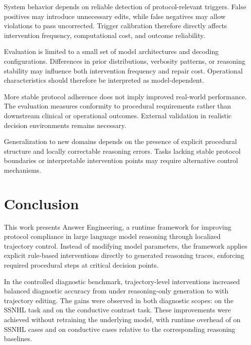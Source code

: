 \documentclass[twocolumn]{article}
\begin{document}
System behavior depends on reliable detection of protocol-relevant triggers.
False positives may introduce unnecessary edits, while false negatives may allow
violations to pass uncorrected. Trigger calibration therefore directly affects
intervention frequency, computational cost, and outcome reliability.

Evaluation is limited to a small set of model architectures and decoding
configurations. Differences in prior distributions, verbosity patterns, or
reasoning stability may influence both intervention frequency and repair cost.
Operational characteristics should therefore be interpreted as model-dependent.

More stable protocol adherence does not imply improved real-world performance.
The evaluation measures conformity to procedural requirements rather than
downstream clinical or operational outcomes. External validation in realistic
decision environments remains necessary.

Generalization to new domains depends on the presence of explicit procedural
structure and locally correctable reasoning errors. Tasks lacking stable
protocol boundaries or interpretable intervention points may require alternative
control mechanisms.

\section{Conclusion}

This work presents Answer Engineering, a runtime framework for improving
protocol compliance in large language model reasoning through localized
trajectory control. Instead of modifying model parameters, the framework applies
explicit rule-based interventions directly to generated reasoning traces,
enforcing required procedural steps at critical decision points.

In the controlled diagnostic benchmark, trajectory-level interventions increased
balanced diagnostic accuracy from \CombinedReasoningBalancedAccuracyPct{} under
reasoning-only generation to \CombinedTrajectoryBalancedAccuracyPct{} with
trajectory editing. The gains were observed in both diagnostic scopes:
\SSNHLTrajectoryDeltaPP{} on the SSNHL task and \ConductiveTrajectoryDeltaPP{}
on the conductive contrast task. These improvements were achieved without
retraining the underlying model, with runtime overhead of
\SSNHLTrajectorySlowdownX{} on SSNHL cases and \ConductiveTrajectorySlowdownX{}
on conductive cases relative to the corresponding reasoning baselines.
\end{document}
